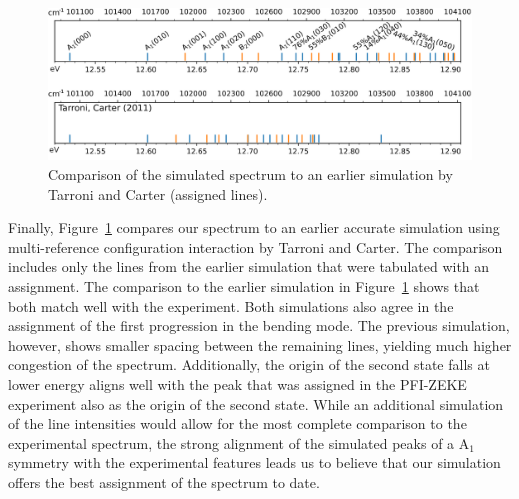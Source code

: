 \documentclass[12pt,prb,aps]{revtex4}
\begin{document}
\begin{figure}
    \includegraphics[width=16 cm]{figures/sim_vs_TarroniCarter.png}
    \caption{Comparison of the simulated spectrum to an earlier simulation
        by Tarroni and Carter (assigned lines).~\cite{tarroni:O3:2011}
    \label{fig:sim_vs_tarronicarter}}
\end{figure}

Finally, Figure~\ref{fig:sim_vs_tarronicarter} compares our spectrum to
an earlier accurate simulation using multi-reference configuration interaction 
by Tarroni and Carter\cite{Willitsch:O3ZEKE:2005}. The comparison includes only the lines
from the earlier simulation that were tabulated with an assignment. 
The comparison to the earlier simulation in
Figure~\ref{fig:sim_vs_tarronicarter} shows that both match well with
the experiment. Both simulations also agree in the assignment of the first
progression in the bending mode. The previous simulation, however, shows
smaller spacing between the remaining lines, yielding much higher congestion of
the spectrum. Additionally, the origin of the second state falls at lower
energy aligns well with the peak that was assigned in the PFI-ZEKE
experiment also as the origin of the second state. While an additional
simulation of the line intensities would allow for the most complete
comparison to the experimental spectrum, the strong alignment of the simulated
peaks of a A$_1$ symmetry with the experimental features leads us to
believe that our simulation offers the best assignment of the spectrum to
date.
\end{document}
